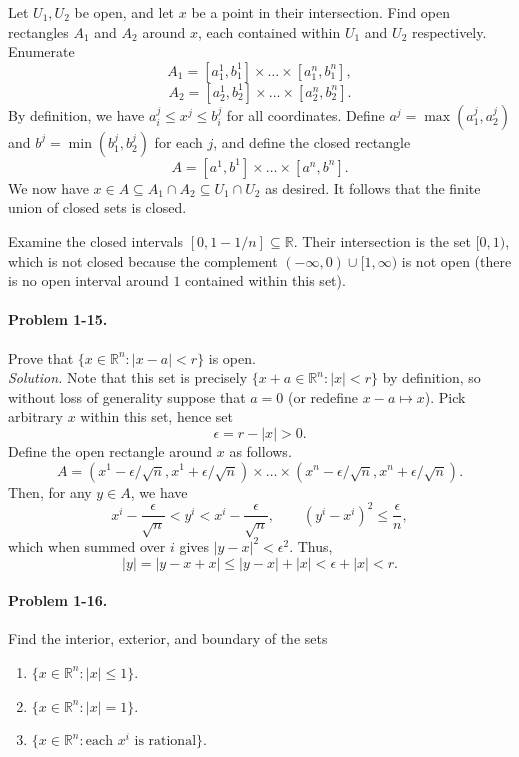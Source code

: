 \documentclass[11pt]{report}
\newcommand{\R}{\mathbb{R}}
\newcommand{\problem}[1]{\paragraph{Problem #1.}}
\newcommand{\solution}{\noindent\textit{Solution.} }
\begin{document}
    Let $U_1, U_2$ be open, and let $x$ be a point in their intersection. Find open
    rectangles $A_1$ and $A_2$ around $x$, each contained within $U_1$ and $U_2$
    respectively. Enumerate \[
        A_1 = [a_1^1, b_1^1] \times \dots \times [a_1^n, b_1^n],
    \] \[
        A_2 = [a_2^1, b_2^1] \times \dots \times [a_2^n, b_2^n].
    \] By definition, we have $a_i^j \leq x^j \leq b_i^j$ for all coordinates. Define
    $a^j = \max(a_1^j, a_2^j)$ and $b^j = \min(b_1^j, b_2^j)$ for each $j$, and
    define the closed rectangle \[
        A = [a^1, b^1] \times \dots \times [a^n, b^n].
    \] We now have $x \in A \subseteq A_1 \cap A_2 \subseteq U_1 \cap U_2$ as
    desired. It follows that the finite union of closed sets is closed.

    Examine the closed intervals $[0, 1 - 1 / n] \subseteq \R$. Their intersection is
    the set $[0, 1)$, which is not closed because the complement $(-\infty, 0) \cup
    [1, \infty)$ is not open (there is no open interval around $1$ contained within
    this set).


    \problem{1-15} Prove that $\{x \in \R^n : |x - a| < r\}$ is open. \\

    \solution Note that this set is precisely $\{x + a \in \R^n : |x| < r\}$ by
    definition, so without loss of generality suppose that $a = 0$ (or redefine $x -
    a \mapsto x$). Pick arbitrary $x$ within this set, hence set \[
       \epsilon = r - |x| > 0.
    \] Define the open rectangle around $x$ as follows. \[
        A = (x^1 - \epsilon / \sqrt{n}, x^1 + \epsilon / \sqrt{n}) \times \dots
        \times (x^n - \epsilon / \sqrt{n}, x^n + \epsilon / \sqrt{n}).
    \] Then, for any $y \in A$, we have \[
        x^i - \frac{\epsilon}{\sqrt{n}} < y^i < x^i - \frac{\epsilon}{\sqrt{n}}, \qquad 
        (y^i - x^i)^2 \leq \frac{\epsilon}{n},
    \] which when summed over $i$ gives $|y - x|^2 < \epsilon^2$. Thus, \[
        |y| = |y - x + x| \leq |y - x| + |x| < \epsilon + |x| < r.
    \] 


    \problem{1-16} Find the interior, exterior, and boundary of the sets
    \begin{enumerate}
        \itemsep0em
        \item $\{x \in \R^n : |x| \leq 1\}$.
        \item $\{x \in \R^n : |x| = 1\}$.
        \item $\{x \in \R^n : \text{each } x^i \text{ is rational}\}$.
    \end{enumerate}
\end{document}
